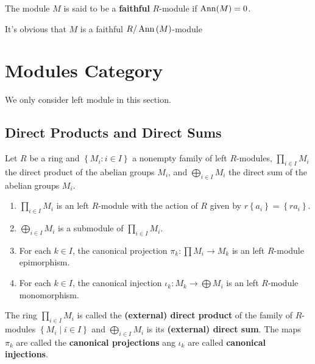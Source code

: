 \begin{definition}
    The module $M$ is said to be a \textbf{faithful} $R$-module if $\operatorname{\operatorname{Ann}}(M)=0$.
    \begin{remark}
        It's obvious that $M$ is a faithful $R/\operatorname{\operatorname{Ann}}\left( M \right)$-module
    \end{remark}
\end{definition}

















\section{Modules Category} %
We only consider left module in this section.

\subsection{Direct Products and Direct Sums}

\begin{definition}
    Let $R$ be a ring and $\left\{  M_i :  i \in   I\right\}$ a nonempty family of left $R$-modules, $\prod_{i \in I}   M_i$ the direct product of the abelian groups $  M_i$, and $\bigoplus_{i \in I}   M_i$ the direct sum of the abelian groups ${M}_i$.
    \begin{enumerate}
        \item
              $\prod_{i \in I}   M_i$ is an left $R$-module with the action of $R$ given by $  {r}\left\{  {a}_i\right\}=\left\{  {ra}_i\right\}$.

        \item
              $\bigoplus_{i \in I}  M_i$ is a submodule of $\prod_{i \in I}   M_i$.

        \item
              For each $ k \in   I$, the canonical projection $\pi_{ k}: \prod   M_i \rightarrow   M_{ k}$ is an left $R$-module epimorphism.

        \item
              For each $ k \in   I$, the canonical injection $\iota_{ k}:   M_{ k} \rightarrow \bigoplus   M_i$  is an left $R$-module monomorphism.
    \end{enumerate}
    The ring $\prod_{i \in I} M_i$ is called the \textbf{(external) direct product} of the family of $R$-modules $\left\{M_i \mid i \in I\right\}$ and $\bigoplus_{i \in I} M_i$ is its \textbf{(external) direct sum}.
    The maps $\pi_k$ are called the \textbf{canonical projections} ang $\iota_k$ are called \textbf{canonical injections}.
\end{definition}


